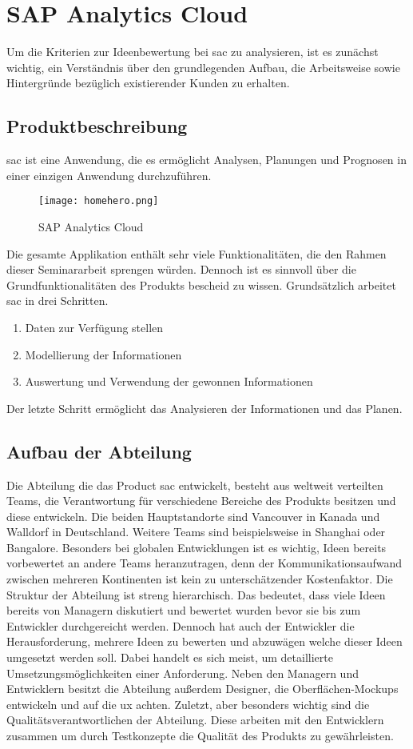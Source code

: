 \newpage
\section{SAP Analytics Cloud}\label{sec:sac}
Um die Kriterien zur Ideenbewertung bei \ac{sac} zu analysieren, ist es zunächst 
wichtig, ein Verständnis über den grundlegenden Aufbau, die Arbeitsweise sowie Hintergründe bezüglich 
existierender Kunden zu erhalten. 

\subsection{Produktbeschreibung}
\ac{sac} ist eine Anwendung, die es ermöglicht Analysen, Planungen und Prognosen in einer einzigen Anwendung durchzuführen. 
\begin{figure}[ht]
	\centering 
	\texttt{[image: homehero.png]}
	\caption{SAP Analytics Cloud}
	\label{img:homeHeroSAC}
\end{figure}
Die gesamte Applikation enthält sehr viele Funktionalitäten, die den Rahmen dieser Seminararbeit sprengen würden. Dennoch ist
es sinnvoll über die Grundfunktionalitäten des Produkts bescheid zu wissen. 
Grundsätzlich arbeitet \ac{sac} in drei Schritten. 

\begin{enumerate}
    \item Daten zur Verfügung stellen
    \item Modellierung der Informationen
    \item Auswertung und Verwendung der gewonnen Informationen 
\end{enumerate}
Der letzte Schritt ermöglicht das Analysieren der Informationen und das Planen. 

\subsection{Aufbau der Abteilung}
Die Abteilung die das Product \ac{sac} entwickelt, besteht aus weltweit verteilten Teams, 
die Verantwortung für verschiedene Bereiche des Produkts besitzen und diese entwickeln. 
Die beiden Hauptstandorte sind Vancouver in Kanada und Walldorf in Deutschland. Weitere Teams sind beispielsweise in 
Shanghai oder Bangalore. Besonders bei globalen Entwicklungen ist es wichtig, Ideen bereits vorbewertet an andere Teams 
heranzutragen, denn der Kommunikationsaufwand zwischen mehreren Kontinenten ist kein zu unterschätzender Kostenfaktor. 
Die Struktur der Abteilung ist streng hierarchisch. Das bedeutet, dass viele Ideen bereits von Managern diskutiert und 
bewertet wurden bevor sie bis zum Entwickler durchgereicht werden. Dennoch hat auch der Entwickler die Herausforderung, 
mehrere Ideen zu bewerten und abzuwägen welche dieser Ideen umgesetzt werden soll. Dabei handelt es sich meist, um detaillierte Umsetzungsmöglichkeiten
einer Anforderung. 
Neben den Managern und Entwicklern besitzt die Abteilung außerdem Designer, die Oberflächen-Mockups entwickeln und auf
die \ac{ux} achten. Zuletzt, aber besonders wichtig sind die Qualitätsverantwortlichen der Abteilung. Diese 
arbeiten mit den Entwicklern zusammen um durch Testkonzepte die Qualität des Produkts zu gewährleisten.

